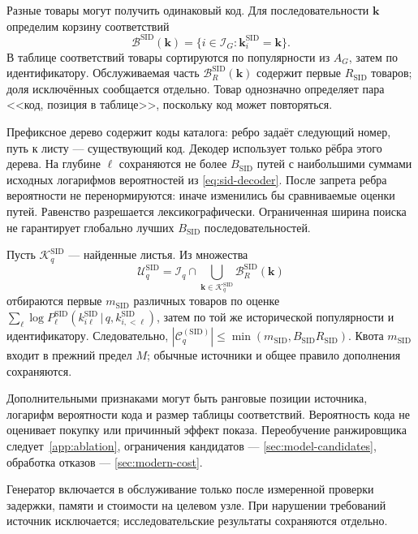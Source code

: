 \documentclass[12pt,a4paper]{article}
\newcommand{\given}{\,\vert\,}
\theoremstyle{plainru}
\begin{document}
Разные товары могут получить одинаковый код.
Для последовательности $\mathbf k$ определим корзину соответствий
\begin{equation}\label{eq:sid-bucket}
 \mathcal B^{\mathrm{SID}}(\mathbf k)
 =\{i\in\mathcal I_G:\mathbf k_i^{\mathrm{SID}}=\mathbf k\}.
\end{equation}
В таблице соответствий товары сортируются по популярности из $A_G$,
затем по идентификатору. Обслуживаемая часть
$\mathcal B_R^{\mathrm{SID}}(\mathbf k)$ содержит первые $R_{\mathrm{SID}}$
товаров; доля исключённых сообщается отдельно. Товар однозначно
определяет пара <<код, позиция в таблице>>, поскольку код может повторяться.

Префиксное дерево содержит коды каталога: ребро задаёт следующий
номер, путь к листу --- существующий код. Декодер использует только
рёбра этого дерева.
На глубине $\ell$ сохраняются не более $B_{\mathrm{SID}}$ путей
с наибольшими суммами исходных логарифмов вероятностей
из \eqref{eq:sid-decoder}. После запрета ребра вероятности
не перенормируются: иначе изменились бы сравниваемые оценки путей.
Равенство разрешается лексикографически. Ограниченная ширина поиска
не гарантирует глобально лучших $B_{\mathrm{SID}}$ последовательностей.

Пусть $\mathcal K_q^{\mathrm{SID}}$ --- найденные листья.
Из множества
\begin{equation}\label{eq:sid-candidates}
 \mathcal U_q^{\mathrm{SID}}
 =\mathcal I_q\cap\bigcup_{\mathbf k\in\mathcal K_q^{\mathrm{SID}}}
                     \mathcal B_R^{\mathrm{SID}}(\mathbf k)
\end{equation}
отбираются первые $m_{\mathrm{SID}}$ различных товаров по оценке
$\sum_\ell\log P_\ell^{\mathrm{SID}}
(k_{i\ell}^{\mathrm{SID}}\given q,k_{i,<\ell}^{\mathrm{SID}})$,
затем по той же исторической популярности и идентификатору.
Следовательно, $|\mathcal C_q^{(\mathrm{SID})}|
\le\min(m_{\mathrm{SID}},B_{\mathrm{SID}}R_{\mathrm{SID}})$.
Квота $m_{\mathrm{SID}}$ входит в прежний предел $M$;
обычные источники и общее правило дополнения сохраняются.

Дополнительными признаками могут быть ранговые позиции источника,
логарифм вероятности кода и размер таблицы соответствий. Вероятность
кода не оценивает покупку или причинный эффект показа. Переобучение
ранжировщика следует~\ref{app:ablation}, ограничения кандидатов ---
\ref{sec:model-candidates}, обработка отказов --- \ref{sec:modern-cost}.

Генератор включается в обслуживание только после измеренной проверки
задержки, памяти и стоимости на целевом узле. При нарушении требований
источник исключается; исследовательские результаты сохраняются отдельно.
\end{document}
